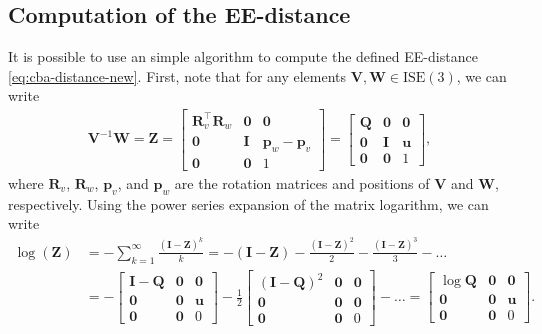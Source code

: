 \subsection{Computation of the EE-distance}
It is possible to use an simple algorithm to compute the defined EE-distance \eqref{eq:cba-distance-new}. First, note that for any elements $\mathbf{V}, \mathbf{W}\in\text{ISE}(3)$, we can write
\begin{align}
    \mathbf{V}^{-1}\mathbf{W} = \mathbf{Z} = \begin{bmatrix}
        \mathbf{R}_v^\top\mathbf{R}_w & \mathbf{0} & \mathbf{0}\\
        \mathbf{0} & \mathbf{I} & \mathbf{p}_w - \mathbf{p}_v\\
        \mathbf{0} & \mathbf{0} & 1
    \end{bmatrix} = \begin{bmatrix}
        \mathbf{Q} & \mathbf{0} & \mathbf{0}\\
        \mathbf{0} & \mathbf{I} & \mathbf{u}\\
        \mathbf{0} & \mathbf{0} & 1
    \end{bmatrix},
\end{align}
where $\mathbf{R}_v$, $\mathbf{R}_w$, $\mathbf{p}_v$, and $\mathbf{p}_w$ are the rotation matrices and positions of $\mathbf{V}$ and $\mathbf{W}$, respectively. Using the power series expansion of the matrix logarithm, we can write
\begin{align}
    \log(\mathbf{Z}) &= -\sum_{k=1}^\infty \frac{(\mathbf{I} - \mathbf{Z})^k}{k} = -(\mathbf{I} - \mathbf{Z}) - \frac{(\mathbf{I} - \mathbf{Z})^2}{2} - \frac{(\mathbf{I} - \mathbf{Z})^3}{3} - \dots\\
    &= -\begin{bmatrix}
        \mathbf{I} - \mathbf{Q} & \mathbf{0} & \mathbf{0}\\
        \mathbf{0} & \mathbf{0} & \mathbf{u}\\
        \mathbf{0} & \mathbf{0} & 0
    \end{bmatrix} - \frac{1}{2}\begin{bmatrix}
        (\mathbf{I} - \mathbf{Q})^2 & \mathbf{0} & \mathbf{0}\\
        \mathbf{0} & \mathbf{0} & \mathbf{0}\\
        \mathbf{0} & \mathbf{0} & 0
    \end{bmatrix} - \dots= \begin{bmatrix}
        \log\mathbf{Q} & \mathbf{0} & \mathbf{0}\\
        \mathbf{0} & \mathbf{0} & \mathbf{u}\\
        \mathbf{0} & \mathbf{0} & 0
    \end{bmatrix}.
\end{align}

